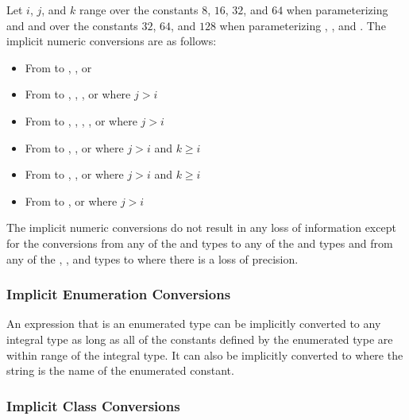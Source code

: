Let $i$, $j$, and $k$ range over the constants $8$, $16$, $32$, and
$64$ when parameterizing  and  and over the
constants $32$, $64$, and $128$ when
parameterizing , , and .  The
implicit numeric conversions are as follows:
\begin{itemize}
\item From  to , , or 
\item From  to , , , or  where $j > i$
\item From  to , , , , or  where $j > i$
\item From  to , , or  where $j > i$ and $k \geq i$
\item From  to , , or  where $j > i$ and $k \geq i$
\item From  to , or  where $j > i$
\end{itemize}

The implicit numeric conversions do not result in any loss of
information except for the conversions from any of the 
and  types to any of the  and 
types and from any of the , , and 
types to  where there is a loss of precision.

\subsubsection{Implicit Enumeration Conversions}
\label{Implicit_Enumeration_Conversions}

An expression that is an enumerated type can be implicitly converted
to any integral type as long as all of the constants defined by the
enumerated type are within range of the integral type.  It can also be
implicitly converted to  where the string is the name of
the enumerated constant.

\subsubsection{Implicit Class Conversions}
\label{Implicit_Class_Conversions}

